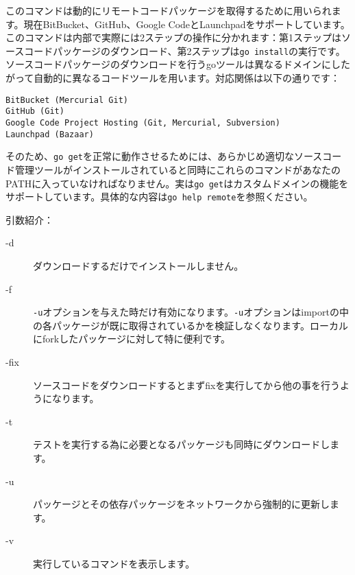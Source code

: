 このコマンドは動的にリモートコードパッケージを取得するために用いられます。現在BitBucket、GitHub、Google CodeとLaunchpadをサポートしています。このコマンドは内部で実際には2ステップの操作に分かれます：第1ステップはソースコードパッケージのダウンロード、第2ステップは\texttt{go install}の実行です。ソースコードパッケージのダウンロードを行うgoツールは異なるドメインにしたがって自動的に異なるコードツールを用います。対応関係は以下の通りです：

\begin{lstlisting}[numbers=none]
BitBucket (Mercurial Git)
GitHub (Git)
Google Code Project Hosting (Git, Mercurial, Subversion)
Launchpad (Bazaar)
\end{lstlisting}

 そのため、\texttt{go get}を正常に動作させるためには、あらかじめ適切なソースコード管理ツールがインストールされていると同時にこれらのコマンドがあなたのPATHに入っていなければなりません。実は\texttt{go get}はカスタムドメインの機能をサポートしています。具体的な内容は\texttt{go help remote}を参照ください。

引数紹介：

\begin{description}
  \item[-d] ダウンロードするだけでインストールしません。
  \item[-f] \texttt{-u}オプションを与えた時だけ有効になります。\texttt{-u}オプションはimportの中の各パッケージが既に取得されているかを検証しなくなります。ローカルにforkしたパッケージに対して特に便利です。
  \item[-fix] ソースコードをダウンロードするとまずfixを実行してから他の事を行うようになります。
  \item[-t] テストを実行する為に必要となるパッケージも同時にダウンロードします。
  \item[-u] パッケージとその依存パッケージをネットワークから強制的に更新します。
  \item[-v] 実行しているコマンドを表示します。
\end{description}
